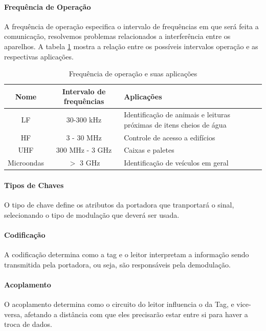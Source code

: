 	\paragraph{Frequência de Operação} A frequência de operação especifica o intervalo de frequências em que será feita a comunicação, resolvemos problemas relacionados a interferência entre os aparelhos. A tabela \ref{tab:freqapp} mostra a relação entre os possíveis intervalos operação e as respectivas aplicações.

		\begin{table}
			\centering
			
			\begin{tabular}{|c|c|p{9cm}|}
				
				\hline Nome & Intervalo de frequências & Aplicações \\ 
				\hline LF & 30-300 kHz & Identificação de animais e leituras próximas de itens cheios de água \\ 
				\hline HF & 3 - 30 MHz & Controle de acesso a edifícios \\ 
				\hline UHF & 300 MHz - 3 GHz & Caixas e paletes \\ 
				\hline Microondas & $>$ 3 GHz & Identificação de veículos em geral \\ 
				\hline 
				
			\end{tabular} 	
			\caption{Frequência de operação e suas aplicações}
			\label{tab:freqapp}
		\end{table}	

	\paragraph{Tipos de Chaves} O tipo de chave define os atributos da portadora que tranportará o sinal, selecionando o tipo de modulação que deverá ser usada.
	
	\paragraph{Codificação} A codificação determina como a tag e o leitor interpretam a informação sendo transmitida pela portadora, ou seja, são responsáveis pela demodulação.
  
	\paragraph{Acoplamento} O acoplamento determina como o circuito do leitor influencia o da Tag, e vice-versa, afetando a distância com que eles precisarão estar entre si para haver a troca de dados.\\
	 

